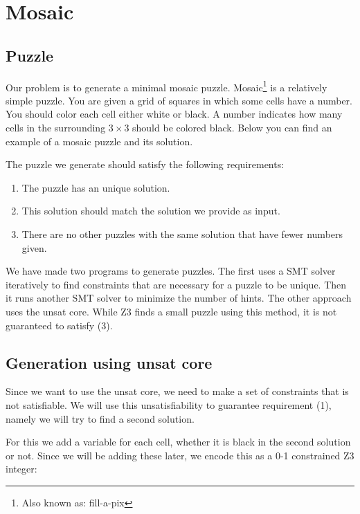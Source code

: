 \documentclass{scrartcl}
\begin{document}
\pagebreak
\section{Mosaic} %
\label{sec:mosaic}
	\subsection{Puzzle} %
	\label{sub:puzzle}
	Our problem is to generate a minimal mosaic puzzle.
	Mosaic\footnote{Also known as: fill-a-pix} is a relatively simple puzzle.
	You are given a grid of squares in which some cells have a number.
	You should color each cell either white or black.
	A number indicates how many cells in the surrounding $3\times3$ should be colored black.
	Below you can find an example of a mosaic puzzle and its solution.

	\begin{figure}[H]
		\centering
		
	\end{figure}

	The puzzle we generate should satisfy the following requirements:
	\begin{enumerate}
		\item The puzzle has an unique solution.
		\item This solution should match the solution we provide as input.
		\item There are no other puzzles with the same solution that have fewer numbers given.
	\end{enumerate}

	We have made two programs to generate puzzles.
	The first uses a SMT solver iteratively to find constraints that are necessary for a puzzle to be unique. Then it runs another SMT solver to minimize the number of hints. The other approach uses the unsat core. While Z3 finds a small puzzle using this method, it is not guaranteed to satisfy (3).

	\subsection{Generation using unsat core} %
	\label{sub:mosaic_unsat_core}
	Since we want to use the unsat core, we need to make a set of constraints that is not satisfiable. We will use this unsatisfiability to guarantee requirement (1), namely we will try to find a second solution.

	For this we add a variable for each cell, whether it is black in the second solution or not. Since we will be adding these later, we encode this as a 0-1 constrained Z3 integer:
\end{document}
